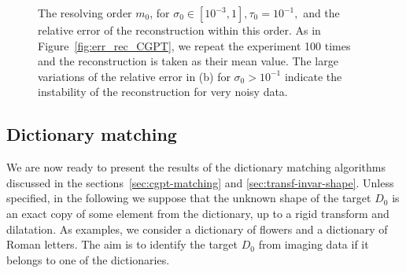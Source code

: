 \begin{figure}[htp]
  \centering
  \caption{The resolving order $m_0$, for $\sigma_0\in[10^{-3},1], \tau_0=10^{-1},$ and
    the relative error of the reconstruction within this order. As in
    Figure~\ref{fig:err_rec_CGPT}, we repeat the experiment 100
    times and the reconstruction is taken as their mean value. The
    large variations of the relative error in (b) for $\sigma_0>10^{-1}$ indicate the
    instability of the reconstruction for very noisy data.}
  \label{fig:rslv_ord_rel_err_CGPT}
\end{figure}

\subsection{Dictionary matching}
We are now ready to present the results of the dictionary matching
algorithms discussed in the sections~\ref{sec:cgpt-matching} and
\ref{sec:transf-invar-shape}. Unless specified, in the following
we suppose that the unknown shape of the target $D_0$ is an exact
copy of some element from the dictionary, up to a rigid transform
and dilatation. As examples, we consider a dictionary of flowers
and a dictionary of Roman letters. The aim is to identify the
target $D_0$ from imaging data if it belongs to one of the
dictionaries.


